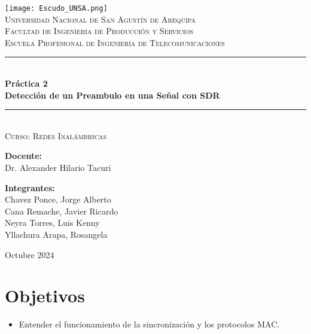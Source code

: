 \documentclass[letterpaper,12pt,oneside]{article}
\begin{document}
\begin{titlepage}
    \centering
    \texttt{[image: Escudo\_UNSA.png]}\\[1cm]
    \textsc{\Large Universidad Nacional de San Agustín de Arequipa}\\[0.5cm]
    \textsc{\large Facultad de Ingeniería de Producción y Servicios}\\[0.5cm]
    \textsc{\large Escuela Profesional de Ingeniería de Telecomunicaciones}\\[1.5cm]
    
    \rule{\linewidth}{0.5mm} \\[0.4cm]
    {\huge \bfseries Práctica 2}\\[0.4cm]
    {\Large \textbf{Detección de un Preambulo en una Señal con SDR}}\\[0.4cm]
    \rule{\linewidth}{0.5mm} \\[1.5cm]
    
    \textsc{\large Curso: Redes Inalámbricas}\\[1.5cm]

    \begin{minipage}{0.45\textwidth}
        \raggedright %
        \textbf{Docente:} \\[0.2cm]
        Dr. Alexander Hilario Tacuri
    \end{minipage}%
    \hfill %
    \begin{minipage}{0.45\textwidth}
        \raggedleft %
        \textbf{Integrantes:} \\[0.2cm]
        Chavez Ponce, Jorge Alberto\\
        Cana Remache, Javier Ricardo\\
        Neyra Torres, Luis Kenny\\
        Yllachura Arapa, Rosangela
    \end{minipage}

    \vfill
    {\large Octubre 2024}
\end{titlepage}


\tableofcontents
\newpage


\section{Objetivos}
\begin{itemize}
    \item Entender el funcionamiento de la sincronización y los protocolos MAC.
\end{itemize}
\end{document}

